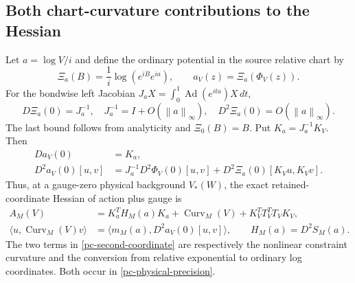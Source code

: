 \documentclass[11pt]{article}
\theoremstyle{remark}
\newcommand{\norm}[1]{\left\|#1\right\|}
\begin{document}
\subsection{Both chart-curvature contributions to the Hessian}
\label{pc-hessian-section}

Let $a=\log V/i$ and define the ordinary potential in the
source relative chart by
\begin{equation}\label{pc-ordinary-coordinates}
 \Xi_a(B)=\frac1i\log(e^{iB}e^{ia}),\qquad
 a_V(z)=\Xi_a(\Phi_V(z)).
\end{equation}
For the bondwise left Jacobian
$J_aX=\int_0^1\operatorname{Ad}(e^{ita})X\,dt$,
\begin{equation}\label{pc-log-jacobian}
 D\Xi_a(0)=J_a^{-1},\quad
 J_a^{-1}=I+O(\norm a_\infty),\quad D^2\Xi_a(0)=O(\norm a_\infty).
\end{equation}
The last bound follows from analyticity and $\Xi_0(B)=B$.
Put $K_a=J_a^{-1}K_V$. Then
\begin{equation}\label{pc-second-coordinate}
 \begin{split}
 Da_V(0)&=K_a,\\
 D^2a_V(0)[u,v]&=J_a^{-1}D^2\Phi_V(0)[u,v]
                 +D^2\Xi_a(0)[K_Vu,K_Vv].
 \end{split}
\end{equation}
Thus, at a gauge-zero physical background $V_*(W)$, the exact
retained-coordinate Hessian of action plus gauge is
\begin{equation}\label{pc-physical-precision}
 \begin{split}
 A_M(V)&=K_a^TH_M(a)K_a+\operatorname{Curv}_M(V)
                  +K_V^TT_V^TT_VK_V,\\
 \langle u,\operatorname{Curv}_M(V)v\rangle
      &=\langle m_M(a),D^2a_V(0)[u,v]\rangle,\qquad
 H_M(a)=D^2S_M(a).
 \end{split}
\end{equation}
The two terms in \eqref{pc-second-coordinate} are respectively
the nonlinear constraint curvature and the conversion from
relative exponential to ordinary log coordinates. Both occur
in \eqref{pc-physical-precision}.
\end{document}
